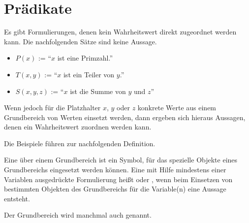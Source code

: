 \section{Prädikate}
\label{sec:ElemLogik-Praedikate}


\begin{Unit}[Beispiel]
\label{bsp:ausPraedikate}
Es gibt Formulierungen, denen kein Wahrheitswert direkt zugeordnet werden 
kann. Die nachfolgenden Sätze sind keine Aussage.

\begin{itemize}
\item $P(x)$ := \enquote{$x$ ist eine Primzahl.} 
\item $T(x, y)$ := \enquote{$x$ ist ein Teiler von $y$.} 
\item $S(x, y, z)$ := \enquote{$x$ ist die Summe von $y$ und $z$}
\end{itemize}

Wenn jedoch für die Platzhalter $x$, $y$ oder $z$ konkrete Werte aus einem
Grundbereich von Werten einsetzt werden, dann ergeben sich hieraus Aussagen, 
denen ein Wahrheitswert zuordnen werden kann.
\end{Unit}

\begin{Unit} Die Beispiele führen zur
nachfolgenden Definition.

\begin{Definition}
Eine  über einem Grundbereich ist ein Symbol, für das 
spezielle Objekte eines Grundbereichs eingesetzt werden können. Eine mit 
Hilfe mindestens einer Variablen ausgedrückte Formulierung heißt
 oder , wenn beim Einsetzen von 
bestimmten Objekten des Grundbereichs für die Variable(n) eine Aussage 
entsteht.
\end{Definition}

Der Grundbereich wird manchmal auch  genannt.
\end{Unit}

